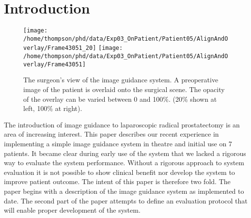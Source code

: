\section{Introduction}
\begin{figure}
\begin{center}
\texttt{[image: /home/thompson/phd/data/Exp03\_OnPatient/Patient05/AlignAndOverlay/Frame43051\_20]}
\texttt{[image: /home/thompson/phd/data/Exp03\_OnPatient/Patient05/AlignAndOverlay/Frame43051]}
\end{center}
\caption{\label{fig:Overlay}The surgeon's view of the image guidance system. A preoperative 
image of the patient is overlaid onto the surgical scene. The opacity of the overlay can 
be varied between 0 and 100\%. (20\% shown at left, 100\% at right).}
\end{figure}

The introduction of image guidance to laparoscopic radical prostatectomy is 
an area of increasing interest.
This paper describes our recent experience in implementing a simple image guidance
system in theatre and initial use on 7 patients. 
It became clear during early use of the system that we lacked
a rigorous way to evaluate the system performance. Without a rigorous approach 
to system evaluation it is not possible to show clinical benefit nor 
develop the system to improve patient outcome. The intent of this paper 
is therefore two fold. The paper begins with a description of the 
image guidance system as implemented to date. The second part of the paper
attempts to define an evaluation protocol that will enable proper development of the
system.



